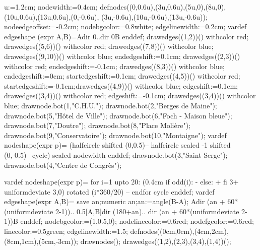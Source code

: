 \documentclass[11pt,a4paper,english]{article}
\begin{document}
\begin{exemple}[listing above text,before lower=\footnotesize]
u:=1.2cm;
nodewidth:=0.4cm;
defnodes((0,0.6u),(3u,0.6u),(5u,0),(8u,0),(10u,0.6u),(13u,0.6u),(0,-0.6u),
                                            (3u,-0.6u),(10u,-0.6u),(13u,-0.6u));
nodeedgeoffset:=-0.2cm;
nodebgcolor:=0.8white;
edgelinewidth:=0.2cm;
vardef edgeshape (expr A,B)=A{dir 0}..{dir 0}B enddef;
drawedges((1,2))() withcolor red;
drawedges((5,6))() withcolor red;
drawedges((7,8))() withcolor blue;
drawedges((9,10))() withcolor blue;
endedgeshift:=0.1cm;   drawedges((2,3))() withcolor red;
endedgeshift:=-0.1cm;  drawedges((8,3))() withcolor blue;
endedgeshift:=0cm;
startedgeshift:=0.1cm; drawedges((4,5))() withcolor red;
startedgeshift:=-0.1cm;drawedges((4,9))() withcolor blue;
edgeshift:=0.1cm;      drawedges((3,4))() withcolor red;
edgeshift:=-0.1cm;     drawedges((3,4))() withcolor blue;
drawnode.bot(1,"C.H.U.");
drawnode.bot(2,"Berges de Maine");
drawnode.bot(5,"Hôtel de Ville");
drawnode.bot(6,"Foch - Maison bleue");
drawnode.bot(7,"Doutre");
drawnode.bot(8,"Place Molière");
drawnode.bot(9,"Conservatoire");
drawnode.bot(10,"Montaigne");
vardef nodeshape(expr p)=
  (halfcircle shifted (0,0.5)--
   halfcircle scaled -1 shifted (0,-0.5)--
    cycle) scaled nodewidth
enddef;
drawnode.bot(3,"Saint-Serge");
drawnode.bot(4,"Centre de Congrès");
\end{exemple}

\begin{exemple}
vardef nodeshape(expr p)=
 for i=1 upto 20:
  (0.4cm if odd(i): - else: + fi 3+ uniformdeviate 3,0) rotated (i*360/20) --
 endfor cycle
enddef;
vardef edgeshape(expr A,B)=
 save an;numeric an;an:=angle(B-A);
 A{dir (an + 60*(uniformdeviate 2-1))}..
 0.5[A,B]{dir (180+an)}..
 {dir (an + 60*(uniformdeviate 2-1))}B
enddef;
nodebgcolor:=(1,0.5,0);
nodelinecolor:=0.6red;
nodefgcolor:=0.6red;
linecolor:=0.5green;
edgelinewidth:=1.5;
defnodes((0cm,0cm),(4cm,2cm),(8cm,1cm),(5cm,-3cm));
drawnodes();
drawedges((1,2),(2,3),(3,4),(1,4))();
\end{exemple}
\end{document}
